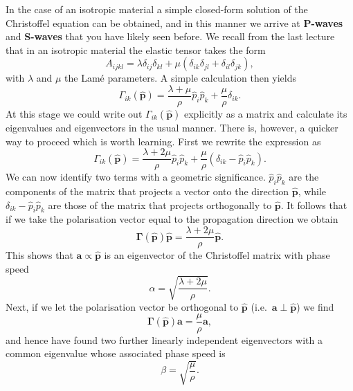 In the case of an isotropic material a simple closed-form solution of the Christoffel equation can be obtained, and in this manner we arrive at \textbf{P-waves} and \textbf{S-waves} that you have likely seen before.
 We recall from the last lecture that in an isotropic material the elastic tensor takes the form
\begin{equation}
A_{ijkl}=\lambda\delta_{ij}\delta_{kl}+\mu(\delta_{ik}\delta_{jl}+\delta_{il}\delta_{jk}),
\label{eq:21}
\end{equation}
with $\lambda$ and $\mu$ the Lamé parameters. A simple calculation then yields
\begin{equation}
\Gamma_{ik}(\hat{\mathbf{p}})=\frac{\lambda+\mu}{\rho}\hat{p}_{i}\hat{p}_{k}+\frac{\mu}{\rho}\delta_{ik}.
\label{eq:22}
\end{equation}
At this stage we could write out $\Gamma_{ik}(\hat{\mathbf{p}})$ explicitly as a matrix and calculate its eigenvalues and eigenvectors in the usual manner. 
There is, however, a quicker way to proceed which is worth learning. First we rewrite the expression as
\begin{equation}
\Gamma_{ik}(\hat{\mathbf{p}})=\frac{\lambda+2\mu}{\rho}\hat{p}_{i}\hat{p}_{k}+\frac{\mu}{\rho}(\delta_{ik}-\hat{p}_{i}\hat{p}_{k}).
\label{eq:23}
\end{equation}
We can now identify two terms with a geometric significance. $\hat{p}_{i}\hat{p}_{k}$ are the components of the matrix that projects a vector onto the direction $\hat{\mathbf{p}}$, while $\delta_{ik}-\hat{p}_{i}\hat{p}_{k}$ are those of the matrix that projects orthogonally
 to $\hat{\mathbf{p}}$. It follows that if we take the polarisation vector equal to the propagation direction we obtain
\begin{equation}
\bm{\Gamma}(\hat{\mathbf{p}})\hat{\mathbf{p}}=\frac{\lambda+2\mu}{\rho}\hat{\mathbf{p}}.
\label{eq:24}
\end{equation}
This shows that $\mathbf{a}\propto \hat{\mathbf{p}}$ is an eigenvector of the Christoffel matrix with phase speed
\begin{equation}
\alpha=\sqrt{\frac{\lambda+2\mu}{\rho}}.
\label{eq:25}
\end{equation}
Next, if we let the polarisation vector be orthogonal to $\hat{\mathbf{p}}$ (i.e.\ $\mathbf{a}\perp \hat{\mathbf{p}}$) we find
\begin{equation}
\bm{\Gamma}(\hat{\mathbf{p}})\mathbf{a}=\frac{\mu}{\rho}\mathbf{a}, 
\label{eq:26}
\end{equation}
and hence have found two further linearly independent eigenvectors with a common eigenvalue whose associated phase speed is
\begin{equation}
\beta=\sqrt{\frac{\mu}{\rho}}.
\label{eq:27}
\end{equation}

